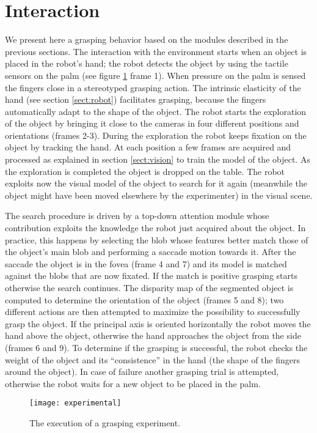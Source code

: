 \section{Interaction}
\label{sect:exp}

We present here a grasping behavior based on the modules described in the previous sections. The interaction with the environment starts when an object is placed in the robot's hand; the robot detects the object by using the tactile sensors on the palm (see figure \ref{fig-experiment} frame 1). When pressure on the palm is sensed the fingers close in a stereotyped grasping action. The intrinsic elasticity of the hand (see section \ref{sect:robot}) facilitates grasping, because the fingers automatically adapt to the shape of the object. The robot starts the exploration of the object by bringing it close to the cameras in four different positions and orientations (frames 2-3). During the exploration the robot keeps fixation on the object by tracking the hand. At each position a few frames are acquired and processed as explained in section \ref{sect:vision} to train the model of the object. As the exploration is completed the object is dropped on the table. The robot exploits now the visual model of the object to search for it again (meanwhile the object might have been moved elsewhere by the experimenter) in the visual scene. 

The search procedure is driven by a top-down attention module whose contribution exploits the knowledge the robot just acquired about the object. In practice, this happens by selecting the blob whose features better match those of the object's main blob and performing a saccade motion towards it. After the saccade the object is in the fovea (frame 4 and 7) and its model is matched against the blobs that are now fixated. If the match is positive grasping starts otherwise the search continues. The disparity map of the segmented object is computed to determine the orientation of the object (frames 5 and 8); two different actions are then attempted to maximize the possibility to successfully grasp the object. If the principal axis is oriented horizontally the robot moves the hand above the object, otherwise the hand approaches the object from the side (frames 6 and 9). To determine if the grasping is successful, the robot checks the weight of the object and its ``consistence'' in the hand (the shape of the fingers around the object). In case of failure another grasping trial is attempted, otherwise the robot waits for a new object to be placed in the palm.

\begin{figure}
\centering
\texttt{[image: experimental]}
\caption{The execution of a grasping experiment.}
\label{fig-experiment}
\end{figure}
